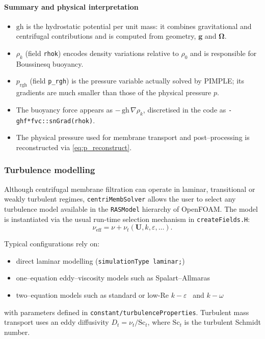 \documentclass[11pt,a4paper]{article}
\begin{document}
\paragraph{Summary and physical interpretation}

\begin{itemize}
	\item \(\mathrm{gh}\) is the hydrostatic potential per unit mass:
	it combines gravitational and centrifugal contributions and is
	computed from geometry, \(\boldsymbol{g}\) and \(\boldsymbol{\Omega}\).
	\item \(\rho_k\) (field \texttt{rhok}) encodes density variations
	relative to \(\rho_0\) and is responsible for Boussinesq
	buoyancy.
	\item \(p_{\mathrm{rgh}}\) (field \texttt{p\_rgh}) is the pressure
	variable actually solved by PIMPLE; its gradients are much
	smaller than those of the physical pressure \(p\).
	\item The buoyancy force appears as
	\(-\,\mathrm{gh}\,\nabla\rho_k\), discretised in the code
	as \texttt{- ghf*fvc::snGrad(rhok)}.
	\item The physical pressure used for membrane transport and
	post–processing is reconstructed via \eqref{eq:p_reconstruct}.
\end{itemize}

\subsubsection{Turbulence modelling}

Although centrifugal membrane filtration can operate in laminar,
transitional or weakly turbulent regimes, \texttt{centriMembSolver}
allows the user to select any turbulence model available in the
\texttt{RASModel} hierarchy of OpenFOAM.  The model is instantiated via
the usual run-time selection mechanism in \texttt{createFields.H}:
\begin{equation}
	\nu_{\mathrm{eff}}
	= \nu + \nu_t(\mathbf{U}, k, \varepsilon, \dots).
\end{equation}

Typical configurations rely on:
\begin{itemize}
	\item direct laminar modelling (\texttt{simulationType laminar;})
	\item one–equation eddy–viscosity models such as Spalart–Allmaras
	\item two–equation models such as standard or low-Re \(k{-}\varepsilon\)
	~and \(k{-}\omega\)
\end{itemize}
with parameters defined in \texttt{constant/turbulenceProperties}.
Turbulent mass transport uses an eddy diffusivity
\(D_t = \nu_t / \mathrm{Sc}_t\), where \(\mathrm{Sc}_t\) is the turbulent
Schmidt number.
\end{document}
